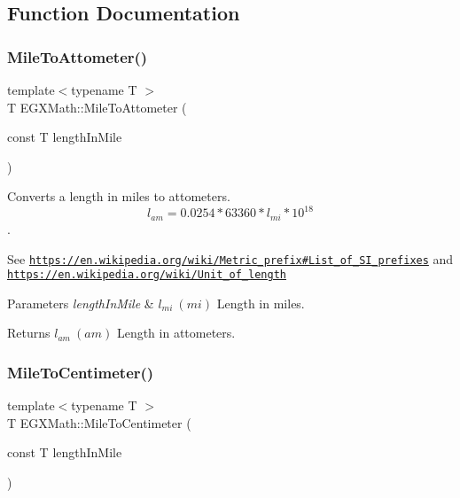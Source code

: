 \subsection{Function Documentation}
\mbox{\label{group___e_g_x_math-_conversions-_length_conversions-_imperial-_mile-_s_i_gafcc088753cafd9bf783abc87dd37a8d9}} 
\subsubsection{\texorpdfstring{Mile\+To\+Attometer()}{MileToAttometer()}}
{\footnotesize\ttfamily template$<$typename T $>$ \\
T E\+G\+X\+Math\+::\+Mile\+To\+Attometer (\begin{DoxyParamCaption}\item[{const T}]{length\+In\+Mile }\end{DoxyParamCaption})}



Converts a length in miles to attometers. \[ l_{am}=0.0254 * 63360 * l_{mi} * 10^{18} \]. 

See \href{https://en.wikipedia.org/wiki/Metric_prefix#List_of_SI_prefixes}{\tt https\+://en.\+wikipedia.\+org/wiki/\+Metric\+\_\+prefix\#\+List\+\_\+of\+\_\+\+S\+I\+\_\+prefixes} and \href{https://en.wikipedia.org/wiki/Unit_of_length}{\tt https\+://en.\+wikipedia.\+org/wiki/\+Unit\+\_\+of\+\_\+length} 
\begin{DoxyParams}{Parameters}
{\em length\+In\+Mile} & $ l_{mi}\ (mi)$ Length in miles. \\
\hline
\end{DoxyParams}
\begin{DoxyReturn}{Returns}
$ l_{am}\ (am)$ Length in attometers. 
\end{DoxyReturn}
\mbox{\label{group___e_g_x_math-_conversions-_length_conversions-_imperial-_mile-_s_i_gae846539455d87b5bc7b4af82c172f184}} 
\subsubsection{\texorpdfstring{Mile\+To\+Centimeter()}{MileToCentimeter()}}
{\footnotesize\ttfamily template$<$typename T $>$ \\
T E\+G\+X\+Math\+::\+Mile\+To\+Centimeter (\begin{DoxyParamCaption}\item[{const T}]{length\+In\+Mile }\end{DoxyParamCaption})}



